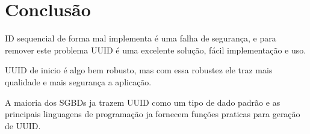 \section{Conclusão}
ID sequencial de forma mal implementa é uma falha de segurança, 
e para remover este problema UUID é uma excelente solução, fácil implementação e uso.

UUID de inicio é algo bem robusto, mas com essa robustez ele traz mais qualidade e mais segurança a aplicação.

A maioria dos SGBDs ja trazem UUID como um tipo de dado padrão e as principais linguagens de programação ja fornecem
funções praticas para geração de UUID.